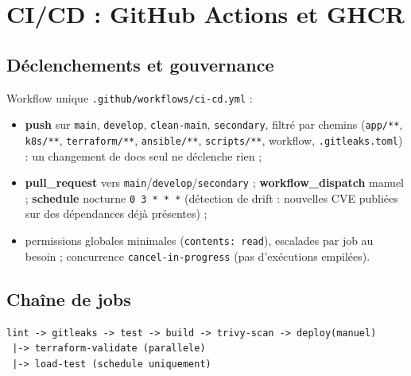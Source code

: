 \documentclass[11pt,a4paper]{article}
\begin{document}
\section{CI/CD : GitHub Actions et GHCR}

\subsection{Déclenchements et gouvernance}
Workflow unique \texttt{.github/workflows/ci-cd.yml} :
\begin{itemize}[itemsep=1pt]
  \item \textbf{push} sur \texttt{main}, \texttt{develop}, \texttt{clean-main}, \texttt{secondary}, filtré par chemins (\texttt{app/**}, \texttt{k8s/**}, \texttt{terraform/**}, \texttt{ansible/**}, \texttt{scripts/**}, workflow, \texttt{.gitleaks.toml}) : un changement de docs seul ne déclenche rien ;
  \item \textbf{pull\_request} vers \texttt{main}/\texttt{develop}/\texttt{secondary} ; \textbf{workflow\_dispatch} manuel ; \textbf{schedule} nocturne \texttt{0 3 * * *} (détection de drift : nouvelles CVE publiées sur des dépendances déjà présentes) ;
  \item permissions globales minimales (\texttt{contents: read}), escalades par job au besoin ; concurrence \texttt{cancel-in-progress} (pas d'exécutions empilées).
\end{itemize}

\subsection{Chaîne de jobs}
\begin{lstlisting}
lint -> gitleaks -> test -> build -> trivy-scan -> deploy(manuel)
 |-> terraform-validate (parallele)
 |-> load-test (schedule uniquement)
\end{lstlisting}
\end{document}
